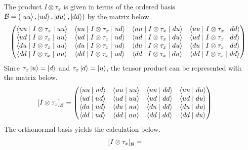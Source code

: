 \begin{answer}
	The product $I \otimes \tau_x$ is given in terms of the ordered basis $\mathcal{B} = \left(\ket{u u}, \ket{u d}, \ket{d u}, \ket{d d}\right)$ by the matrix below.
	\begin{align*}
		\begin{pmatrix}
			\braket{u u \mid I \otimes \tau_x \mid u u } &
			\braket{u u \mid I \otimes \tau_x \mid u d } &
			\braket{u u \mid I \otimes \tau_x \mid d u } &
			\braket{u u \mid I \otimes \tau_x \mid d d }   \\
			\braket{u d \mid I \otimes \tau_x \mid u u } &
			\braket{u d \mid I \otimes \tau_x \mid u d } &
			\braket{u d \mid I \otimes \tau_x \mid d u } &
			\braket{u d \mid I \otimes \tau_x \mid d d }   \\
			\braket{d u \mid I \otimes \tau_x \mid u u } &
			\braket{d u \mid I \otimes \tau_x \mid u d } &
			\braket{d u \mid I \otimes \tau_x \mid d u } &
			\braket{d u \mid I \otimes \tau_x \mid d d }   \\
			\braket{d d \mid I \otimes \tau_x \mid u u } &
			\braket{d d \mid I \otimes \tau_x \mid u d } &
			\braket{d d \mid I \otimes \tau_x \mid d u } &
			\braket{d d \mid I \otimes \tau_x \mid d d }   \\
		\end{pmatrix}
	\end{align*}
	Since $\tau_x \ket{u} = \ket{d}$ and $\tau_x \ket{d} = \ket{u}$, the tensor product can be represented with the matrix below.
	\begin{align}
		\left[I \otimes \tau_x\right]_{\mathcal{B}} & =
		\begin{pmatrix}
			\braket{u u \mid u d } &
			\braket{u u \mid u u } &
			\braket{u u \mid d d } &
			\braket{u u \mid d u }   \\
			\braket{u d \mid u d } &
			\braket{u d \mid u u } &
			\braket{u d \mid d d } &
			\braket{u d \mid d u }   \\
			\braket{d u \mid u d } &
			\braket{d u \mid u u } &
			\braket{d u \mid d d } &
			\braket{d u \mid d u }   \\
			\braket{d d \mid u d } &
			\braket{d d \mid u u } &
			\braket{d d \mid d d } &
			\braket{d d \mid d u }   \\
		\end{pmatrix}
	\end{align}
	The orthonormal basis yields the calculation below.
	\begin{align*}
		\left[I \otimes \tau_x\right]_{\mc{B}} & =

\end{align*}
\end{answer}
